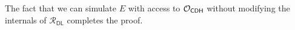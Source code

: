 \documentclass[fullpage]{article}
\theoremstyle{definition}
\newcommand{\EncSign}{\textsf{EncSign}}
\newcommand{\KeyGen}{\textsf{Gen}}
\newcommand{\Sign}{\textsf{Sign}}
\newcommand{\Verify}{\textsf{Vrfy}}
\newcommand{\RecKey}{\textsf{RecKey}}
\newcommand{\rec}{\delta}
\newcommand{\RDL}{\mathcal{R}_{\DLOG}}
\newcommand{\DLOG}{\textsf{DL}\xspace}
\begin{document}
The fact that we can simulate $E$ with access to $\mathcal{O}_{\textsf{CDH}}$ without modifying the internals of $\RDL$ completes the proof.


\end{document}
